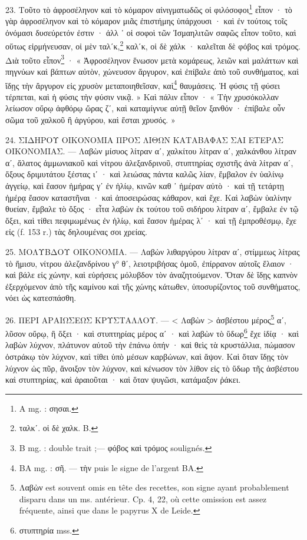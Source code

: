 \documentclass[a4paper, 11pt, oneside, polutonikogreek, french]{article}
\begin{document}
23. Τοῦτο τὸ ἀφροσέληνον καὶ τὸ κόμαρον αἰνιγματωδῶς οἱ φιλόσοφοι\footnote{A mg. : σησαι.} εἶπον · τὸ γὰρ ἀφροσέληνον καὶ τὸ κόμαρον μιᾶς ἐπιστήμης ὑπάρχουσι · καὶ ἐν τούτοις τοῖς ὀνόμασι δυσεύρετόν ἐστιν · ἀλλ ᾽ οἱ σοφοὶ τῶν Ἰσμαηλιτῶν σαφῶς εἶπον τοῦτο, καὶ οὕτως εἱρμήνευσαν, οἱ μὲν ταλʹκ,\footnote{ταλκʹ. οἱ δὲ χαλκ. B.} καλʹκ, οἱ δὲ χάλκ · καλεῖται δὲ φόβος καὶ τρόμος. Διὰ τοῦτο εἶπον\footnote{B mg. : double trait ;--- φόβος καὶ τρόμος soulignés.} · « Ἀφροσέληνον ἕνωσον μετὰ κομάρεως, λειῶν καὶ μαλάττων καὶ πηγνύων καὶ βάπτων αὐτὸν, χώνευσον ἄργυρον, καὶ ἐπίβαλε ἀπὸ τοῦ συνθήματος, καὶ ἴδῃς τὴν ἄργυρον εἰς χρυσὸν μεταποιηθεῖσαν, καὶ\footnote{BA mg. : σῆ. --- τὴν puis le signe de l'argent BA.} θαυμάσεις. Ἡ φύσις τῇ φύσει τέρπεται, καὶ ἡ φύσις τὴν φύσιν νικᾷ. » Καὶ πάλιν εἶπον · « Τὴν χρυσόκολλαν λείωσον οὔρῳ ἀφθόρῳ ὥρας ζʹ, καὶ καταμίγνυε αὐτῇ θεῖον ξανθόν · ἐπίβαλε οὖν σῶμα τοῦ χαλκοῦ ἢ ἀργύρου, καὶ ἔσται χρυσός. »

24. ΣΙΔΗΡΟΥ ΟΙΚΟΝΟΜΙΑ ΠΡΟΣ ΛΙΘΩΝ ΚΑΤΑΒΑΦΑΣ ΣΑΙ ΕΤΕΡΑΣ ΟΙΚΟΝΟΜΙΑΣ. --- Λαβὼν μίσυος λίτραν αʹ, χαλκίτου λίτραν αʹ, χαλκάνθου λίτραν αʹ, ἅλατος ἀμμωνιακοῦ καὶ νίτρου ἀλεξανδρινοῦ, στυπτηρίας σχιστῆς ἀνὰ λίτραν αʹ, ὄξους δριμυτάτου ξέστας ιʹ · καὶ λειώσας πάντα καλῶς λίαν, ἔμβαλον ἐν ὑαλίνῳ ἀγγείῳ, καὶ ἔασον ἡμήρας γʹ ἐν ἡλίῳ, κινῶν καθ ᾽ ἡμέραν αὐτὸ · καὶ τῇ τετάρτῃ ἡμέρᾳ ἔασον καταστῆναι · καὶ ἀποσειρώσας κάθαρον, καὶ ἔχε. Καὶ λαβὼν ὑαλίνην θυείαν, ἔμβαλε τὸ ὄξος · εἶτα λαβὼν ἐκ τούτου τοῦ σιδήρου λίτραν αʹ, ἔμβαλε ἐν τῷ ὄξει, καὶ τίθει πεφιμωμένως ἐν ἡλίῳ, καὶ ἔασον ἡμέρας λʹ · καὶ τῇ ἐμπροθέσμῳ, ἔχε εἰς (f. 153 r.) τὰς δηλουμένας σοι χρείας.

25. ΜΟΛΥΒΔΟΥ ΟΙΚΟΝΟΜΙΑ. --- Λαβὼν λιθαργύρου λίτραν αʹ, στίμμεως λίτρας τὸ ἥμισυ, νίτρου ἀλεζανδρίνου γ° θʹ, λειοτριβήσας ὁμοῦ, ἐπίρρανον αὐτοῖς ἔλαιον · καὶ βάλε εἰς χώνην, καὶ εὑρήσεις μόλυβδον τὸν ἀναζητούμενον. Ὅταν δὲ ἴδῃς καπνὸν ἐξερχόμενον ἀπὸ τῆς καμίνου καὶ τῆς χώνης κάτωθεν, ὑποσυρίζοντος τοῦ συνθήματος, νόει ὡς κατεσπάσθη.

26. ΠΕΡΙ ΑΡΑΙΩΣΕΩΣ ΚΡΥΣΤΑΛΛΟΥ. --- < Λαβὼν > ἀσβέστου μέρος\footnote{Λαβὼν est souvent omis en tête des recettes, son signe ayant probablement disparu dans un ms. antérieur. Cp. 4, 22, où cette omission est assez fréquente, ainsi que dans le papyrus X de Leide.} αʹ, λῦσον οὔρῳ, ἢ ὄξει · καὶ στυπτηρίας μέρος αʹ · καὶ λαβὼν τὸ ὕδωρ\footnote{στυπτηρία mss.} ἔχε ἰδίᾳ · καὶ λαβὼν λύχνον, πλάτυνον αὐτοῦ τὴν ἐπάνω ὀπήν · καὶ θεὶς τὰ κρυστάλλια, πώμασον ὀστράκῳ τὸν λύχνον, καὶ τίθει ὑπὸ μέσων καρβώνων, καὶ ἅψον. Καὶ ὅταν ἴδῃς τὸν λύχνον ὡς πῦρ, ἄνοιξον τὸν λύχνον, καὶ κένωσον τὸν λίθον εἰς τὸ ὕδωρ τῆς ἀσβέστου καὶ στυπτηρίας, καὶ ἀραιοῦται · καὶ ὅταν ψυγῶσι, κατάμαξον ῥάκει.
\end{document}
